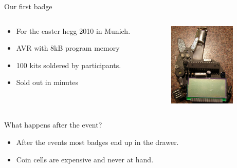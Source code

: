 \documentclass{beamer}
\begin{document}
\begin{frame}{Our first badge}
  \begin{columns}
    \begin{column}{6cm}
        \begin{itemize}
	    \item For the easter hegg 2010 in Munich.
	    \item AVR with 8kB program memory
	    \item 100 kits soldered by participants.
	    \item Sold out in minutes
	\end{itemize}
    \end{column}
    \begin{column}{6cm}
        \includegraphics[height=4cm]{bilder/ehaserl.jpg}\\
    \end{column}
  \end{columns}
  \end{frame}
\begin{frame}{What happens after the event?}
	\begin{itemize}
		\item After the events most badges end up in the drawer.
		\item Coin cells are expensive and never at hand.
	\end{itemize}
\end{frame}
\end{document}
